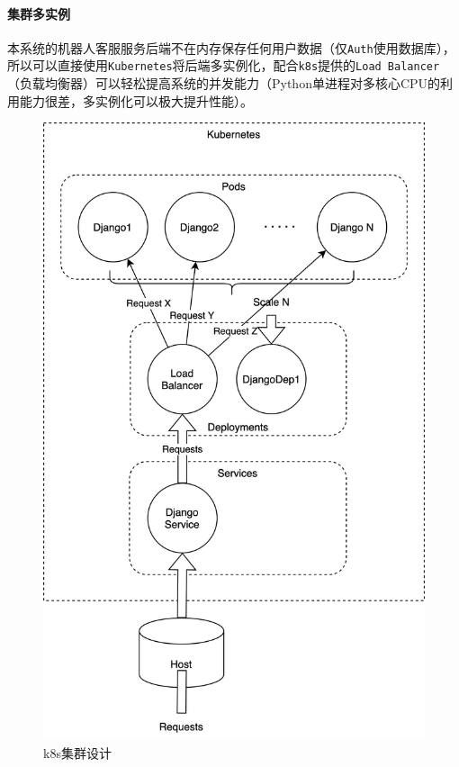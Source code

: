\documentclass[hyperref]{ctexart}
\begin{document}
\paragraph{集群多实例}
本系统的机器人客服服务后端不在内存保存任何用户数据（仅\texttt{Auth}使用数据库），所以可以直接使用\texttt{Kubernetes}将后端多实例化，配合\texttt{k8s}提供的\texttt{Load Balancer}（负载均衡器）可以轻松提高系统的并发能力（Python单进程对多核心CPU的利用能力很差，多实例化可以极大提升性能）。
\begin{figure}[H]
    \centering
    \includegraphics[scale=0.13]{figure/6.png}
    \caption{k8s集群设计}
    \label{Fig.1.6}
\end{figure}
\end{document}
